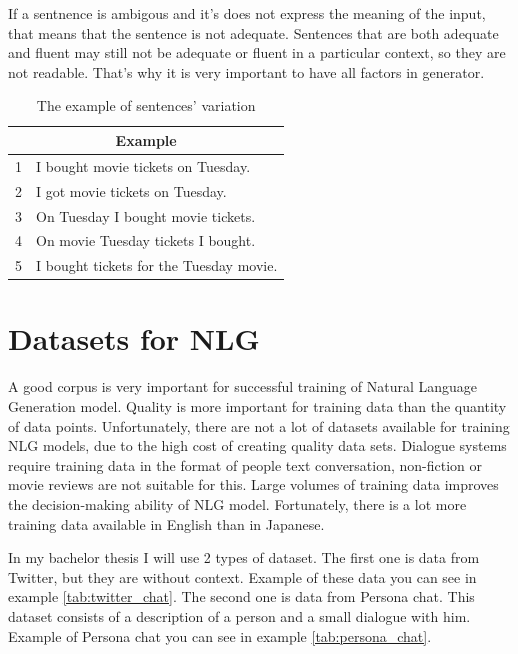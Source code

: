 If a sentnence is ambigous and it's does not express the meaning of the input, that means that the sentence is not adequate. Sentences that are both adequate and fluent may still not be adequate or fluent in a particular context, so they are not readable. That's why it is very important to have all factors in generator.

\begin{table}[t]
\centering
 \begin{tabular}{|p{0.5cm}|p{8cm}|} 
 \hline
 \multicolumn{2}{|c|}{Example} \\
 \hline
 1 & I bought movie tickets on Tuesday. \\ 
 \hline
 2 & I got movie tickets on Tuesday. \\
 \hline
 3 & On Tuesday I bought movie tickets. \\
 \hline
 4 & On movie Tuesday tickets I bought. \\
 \hline
 5 & I bought tickets for the Tuesday movie. \\ 
 \hline
 \end{tabular}
 \caption{The example of sentences' variation}
\label{tab:var_example}
\end{table}

\section{Datasets for NLG}
A good corpus is very important for successful training of Natural Language Generation model. Quality is more important for training data than the quantity of data points. Unfortunately, there are not a lot of datasets available for training NLG models, due to the high cost of creating quality data sets. Dialogue systems require training data in the format of people text conversation, non-fiction or movie reviews are not suitable for this. Large volumes of training data improves the decision-making ability of NLG model. Fortunately, there is a lot more training data available in English than in Japanese.

In my bachelor thesis I will use 2 types of dataset. The first one is data from Twitter, but they are without context. Example of these data you can see in example \ref{tab:twitter_chat}. The second one is data from Persona chat. This dataset consists of a description of a person and a small dialogue with him. Example of Persona chat you can see in example \ref{tab:persona_chat}.


